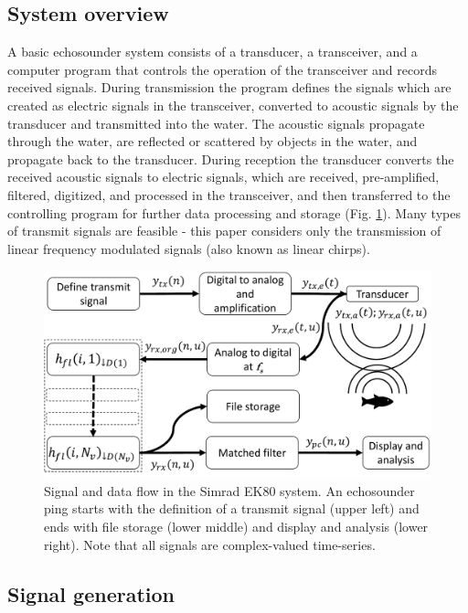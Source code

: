 \documentclass[preprint,12pt,TurnOnLineNumbers]{JASAnew}
\newcommand{\ek}{Simrad EK80}
\begin{document}
\subsection{System overview}
A basic echosounder system consists of a transducer, a transceiver, and a computer program that controls the operation of the transceiver and records received signals. During transmission the program defines the signals which are created as electric signals in the transceiver, converted to acoustic signals by the transducer and transmitted into the water. The acoustic signals propagate through the water, are reflected or scattered by objects in the water, and propagate back to the transducer. During reception the transducer converts the received acoustic signals to electric signals, which are received, pre-amplified, filtered, digitized, and processed in the transceiver, and then transferred to the controlling program for further data processing and storage (Fig. \ref{fi:ek_sys}). Many types of transmit signals are feasible - this paper considers only the transmission of linear frequency modulated signals (also known as linear chirps).

\begin{figure}
\includegraphics[width=16cm]{Fig_ek_sys}
\caption{\label{fi:ek_sys}Signal and data flow in the \ek{} system. An echosounder ping starts with the definition of a transmit signal (upper left) and ends with file storage (lower middle) and display and analysis (lower right). Note that all signals are complex-valued time-series.}
\end{figure}

\subsection{Signal generation}
\end{document}
